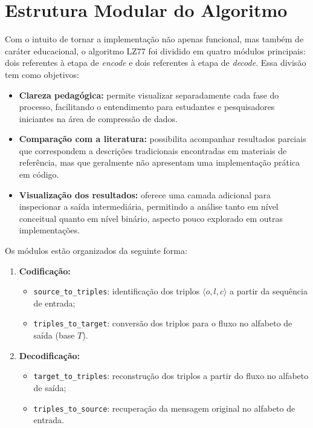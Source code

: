 \section{Estrutura Modular do Algoritmo}

Com o intuito de tornar a implementação não apenas funcional, mas também de
caráter educacional, o algoritmo LZ77 foi dividido em quatro módulos
principais: dois referentes à etapa de \textit{encode} e dois referentes à
etapa de \textit{decode}. Essa divisão tem como objetivos:

\begin{itemize}
    \item \textbf{Clareza pedagógica:} permite visualizar separadamente cada fase do processo, facilitando o entendimento para estudantes e pesquisadores iniciantes na área de compressão de dados.
    \item \textbf{Comparação com a literatura:} possibilita acompanhar resultados parciais que correspondem a descrições tradicionais encontradas em materiais de referência, mas que geralmente não apresentam uma implementação prática em código.
    \item \textbf{Visualização dos resultados:} oferece uma camada adicional para inspecionar a saída intermediária, permitindo a análise tanto em nível conceitual quanto em nível binário, aspecto pouco explorado em outras implementações.
\end{itemize}

Os módulos estão organizados da seguinte forma:
\begin{enumerate}
    \item \textbf{Codificação:}
          \begin{itemize}
              \item \texttt{source\_to\_triples}: identificação dos triplos $\langle o, l, c \rangle$ a partir da sequência de entrada;
              \item \texttt{triples\_to\_target}: conversão dos triplos para o fluxo no alfabeto de saída (base $T$).
          \end{itemize}
    \item \textbf{Decodificação:}
          \begin{itemize}
              \item \texttt{target\_to\_triples}: reconstrução dos triplos a partir do fluxo no alfabeto de saída;
              \item \texttt{triples\_to\_source}: recuperação da mensagem original no alfabeto de entrada.
          \end{itemize}
\end{enumerate}

